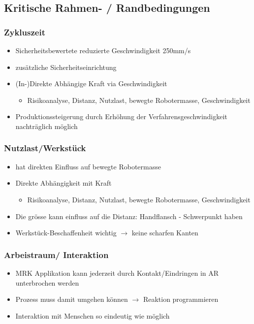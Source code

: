 \subsection{Kritische Rahmen- / Randbedingungen}
\begin{minipage}{0.5\linewidth}
    \subsubsection{Zykluszeit}
    \begin{itemize}
        \item Sicherheitsbewertete reduzierte Geschwindigkeit 250mm/s
        \item zusätzliche Sicherheitseinrichtung
        \item (In-)Direkte Abhängige Kraft via Geschwindigkeit
        \begin{itemize}
            \item Risikoanalyse, Distanz, Nutzlast, bewegte Robotermasse, Geschwindigkeit
        \end{itemize}
        \item Produktionssteigerung durch Erhöhung der Verfahrensgeschwindigkeit nachträglich möglich
    \end{itemize}
\end{minipage}
\begin{minipage}{0.5\linewidth}
    \subsubsection{Nutzlast/Werkstück}
    \begin{itemize}
        \item hat direkten Einfluss auf bewegte Robotermasse
        \item Direkte Abhängigkeit mit Kraft
        \begin{itemize}
            \item Risikoanalyse, Distanz, Nutzlast, bewegte Robotermasse, Geschwindigkeit
        \end{itemize}
        \item Die grösse kann einfluss auf die Distanz: Handflansch - Schwerpunkt haben
        \item Werkstück-Beschaffenheit wichtig $\rightarrow$ keine scharfen Kanten
    \end{itemize}
\end{minipage}
\begin{minipage}{0.5\linewidth}
    \subsubsection{Arbeistraum/ Interaktion}
    \begin{itemize}
        \item MRK Applikation kann jederzeit durch Kontakt/Eindringen in AR unterbrochen werden
        \item Prozess muss damit umgehen können $\rightarrow$ Reaktion programmieren
        \item Interaktion mit Menschen so eindeutig wie möglich
    \end{itemize}
\end{minipage}
